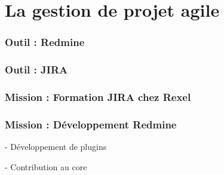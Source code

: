 \section{La gestion de projet agile}

\subsubsection{Outil : Redmine}

\subsubsection{Outil : JIRA}

\subsubsection{Mission : Formation JIRA chez Rexel}

\subsubsection{Mission : Développement Redmine}

- Développement de plugins

- Contribution au core

